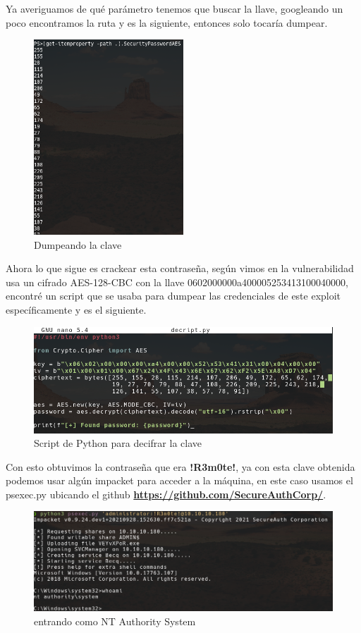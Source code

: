 \documentclass{article}
\begin{document}
Ya averiguamos de qué parámetro tenemos que buscar la llave, googleando un poco encontramos la ruta y es la siguiente, entonces solo tocaría dumpear.
\begin{figure}[h!]
	\center 
	\includegraphics[width=0.5\textwidth]{images/remote/dumpeo-hash.png}
	\caption{Dumpeando la clave}
\end{figure}

\clearpage

Ahora lo que sigue es crackear esta contraseña, según vimos en la vulnerabilidad usa un cifrado AES-128-CBC con la llave 0602000000a400005253413100040000, encontré un script que se usaba para dumpear las credenciales de este exploit específicamente y es el siguiente.
\begin{figure}[h]
	\center 
	\includegraphics[width=\textwidth]{images/remote/script-python-hash.png}
	\caption{Script de Python para decifrar la clave}
\end{figure}

Con esto obtuvimos la contraseña que era \textbf{!R3m0te!}, ya con esta clave obtenida podemos usar algún impacket para acceder a la máquina, en este caso usamos el psexec.py ubicando el github \textbf{\href{https://github.com/SecureAuthCorp/impacket/blob/master/examples/psexec.py}{https://github.com/SecureAuthCorp/}}.
\begin{figure}[h]
	\center 
	\includegraphics[width=\textwidth]{images/remote/exito-administrator.png}
	\caption{entrando como NT Authority System}
\end{figure}
\end{document}
